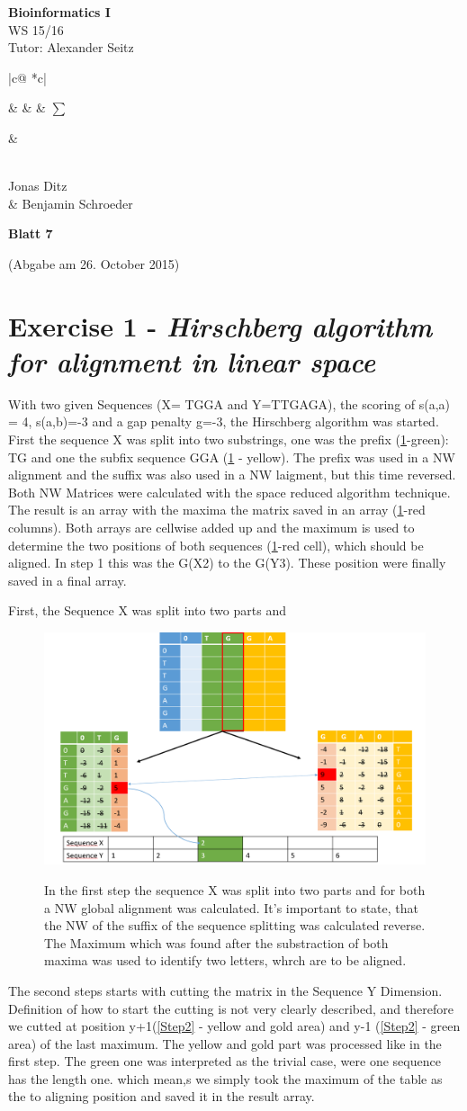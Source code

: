 \documentclass[%
   10pt,              %
   nenglish,           %
   a4paper,           %
   DIV11,             %
]{scrartcl}%
\makeatletter
\def\header#1#2#3#4#5#6#7{\pagestyle{empty}
\noindent
\begin{minipage}[t]{0.6\textwidth}
\begin{flushleft}
\textbf{#4}\\%
#6\\%
Tutor: #2  %
\end{flushleft}
\end{minipage}
\begin{minipage}[t]{0.4\textwidth}
\begin{flushright}
\points{#7}%
\vspace*{0.2cm}
#5%
\end{flushright}
\end{minipage}

\begin{center}
{\Large\textbf{ Blatt #1}} %

{(Abgabe am #3)} %
\end{center}
}
\newenvironment{vartab}[1]
{
    \begin{tabular}{ |c@{} *{#1}{c|} } %
}{
    \end{tabular}
}
\newcommand{\myformat}[1]{& #1}
\newcommand{\numbers}[1]{
  \newcounter{ctra}
\setcounter{ctra}{1}
\whiledo {\value{ctra} < #1}%
{%
  \myformat{\thectra}
  \stepcounter{ctra}%
}
\myformat{\thectra}
}
\newcommand{\emptyLine}[1]{
  \newcounter{ctra1}
\setcounter{ctra}{1}
\whiledo {\value{ctra1} < #1}%
{%
  \myformat{\hspace*{0.5cm}}
  \stepcounter{ctra1}%
}
}
\newcommand{\points}[1]{
\newcounter{colmns}
\setcounter{colmns}{#1}
\stepcounter{colmns}
  \begin{vartab}{\thecolmns}
    \numbers{#1} & $\sum$\\\hline
    \emptyLine{\thecolmns}\\
  \end{vartab}
}
\makeatother
\begin{document}
\header{7}{Alexander Seitz}{26. October 2015}{Bioinformatics I}{\\Jonas Ditz \\\& Benjamin Schroeder}{WS 15/16}{3}

 \section*{Exercise 1 - \textsl{Hirschberg algorithm for alignment in linear space}}
  With two given Sequences (X= TGGA and Y=TTGAGA), the scoring of s(a,a) = 4, s(a,b)=-3 and a gap penalty g=-3, the Hirschberg algorithm was started. First the sequence X was split into two substrings, one was the prefix (\ref{Step1}-green): TG and one the subfix sequence GGA (\ref{Step1} - yellow). The prefix was used in a NW alignment and the suffix was also used in a NW laigment, but this time reversed. Both NW Matrices were calculated with the space reduced algorithm technique. The result is an array with the maxima the matrix saved in an array (\ref{Step1}-red columns). Both arrays are cellwise added up and the maximum is used to determine the two positions of both sequences (\ref{Step1}-red cell), which should be aligned. In step 1 this was the G(X2) to the G(Y3). These position were finally saved in a final array.
 
 First, the Sequence X was split into two parts and 
  \begin{figure}[h]
  	\includegraphics[scale=0.25]{img/Hirschberg_Step1.png}
  	\label{Step1}
  	\caption{In the first step the sequence X was split into two parts and for both a NW global alignment was calculated. It's important to state, that the NW of the suffix of the sequence splitting was calculated reverse. The Maximum which was found after the substraction of both maxima was used to identify two letters, whrch are to be aligned.}
  \end{figure}
  The second steps starts with cutting the  matrix in the Sequence Y Dimension. Definition of how to start the cutting is not very clearly described, and therefore we cutted at position y+1(\ref{Step2} - yellow and gold area) and y-1 (\ref{Step2} - green area) of the last maximum. The yellow and gold part was processed like in the first step. The green one was interpreted as the trivial case, were one sequence has the length one. which mean,s we simply took the maximum of the table as the to aligning position and saved it in the result array.
   
\end{document}
